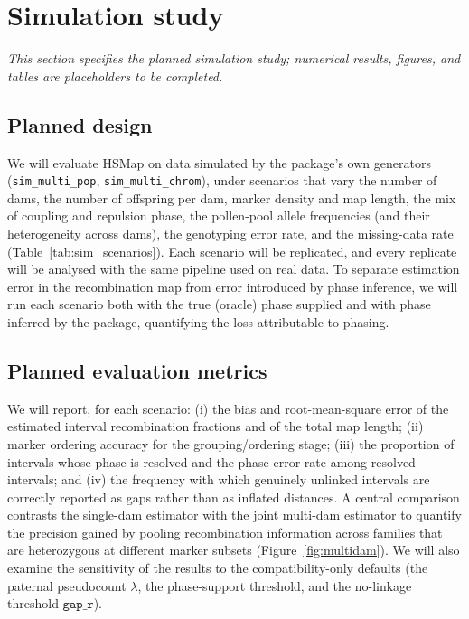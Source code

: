 \documentclass[11pt]{article}
\begin{document}
\section{Simulation study}\label{sec:sim}
\emph{This section specifies the planned simulation study; numerical results, figures,
and tables are placeholders to be completed.}

\subsection{Planned design}
We will evaluate \textsf{HSMap} on data simulated by the package's own generators
(\texttt{sim\_multi\_pop}, \texttt{sim\_multi\_chrom}), under scenarios that vary the
number of dams, the number of offspring per dam, marker density and map length, the mix
of coupling and repulsion phase, the pollen-pool allele frequencies (and their
heterogeneity across dams), the genotyping error rate, and the missing-data rate
(Table~\ref{tab:sim_scenarios}). Each scenario will be replicated, and every replicate
will be analysed with the same pipeline used on real data. To separate estimation error
in the recombination map from error introduced by phase inference, we will run each
scenario both with the true (oracle) phase supplied and with phase inferred by the
package, quantifying the loss attributable to phasing.

\subsection{Planned evaluation metrics}
We will report, for each scenario: (i) the bias and root-mean-square error of the
estimated interval recombination fractions and of the total map length; (ii) marker
ordering accuracy for the grouping/ordering stage; (iii) the proportion of intervals
whose phase is resolved and the phase error rate among resolved intervals; and (iv) the
frequency with which genuinely unlinked intervals are correctly reported as gaps rather
than as inflated distances. A central comparison contrasts the single-dam estimator with
the joint multi-dam estimator to quantify the precision gained by pooling recombination
information across families that are heterozygous at different marker subsets
(Figure~\ref{fig:multidam}). We will also examine the sensitivity of the results to the
compatibility-only defaults (the paternal pseudocount $\lambda$, the phase-support
threshold, and the no-linkage threshold $\texttt{gap\_r}$).
\end{document}
